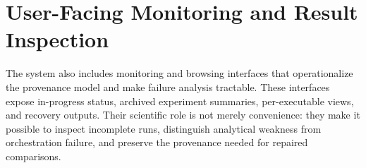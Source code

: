 \section{User-Facing Monitoring and Result Inspection}

The system also includes monitoring and browsing interfaces that operationalize the provenance model and make failure analysis tractable. These interfaces expose in-progress status, archived experiment summaries, per-executable views, and recovery outputs. Their scientific role is not merely convenience: they make it possible to inspect incomplete runs, distinguish analytical weakness from orchestration failure, and preserve the provenance needed for repaired comparisons.
